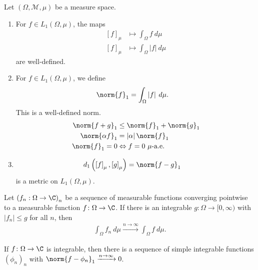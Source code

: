 \begin{fact}
  Let $\left(\Omega,\mathcal{M},\mu\right)$ be a measure space.
  \begin{enumerate}[(1)]
    \item For $f\in L_{1}\left(\Omega,\mu\right)$, the maps
      \begin{align*}
        \left[f\right]_{\mu} &\longmapsto \int_{\Omega}^{} f\:d\mu\\
        \left[f\right]_{\mu} &\longmapsto \int_{\Omega}^{} \left\vert f \right\vert\:d\mu
      \end{align*}
      are well-defined.
    \item For $f\in L_{1}\left(\Omega,\mu\right)$, we define
      \begin{align*}
        \norm{f}_{1} &= \int_{\Omega}^{} \left\vert f \right\vert\:d\mu.
      \end{align*}
      This is a well-defined norm.
      \begin{align*}
        \norm{f+g}_{1} &\leq \norm{f}_{1} + \norm{g}_{1}\\
        \norm{\alpha f}_1 &= \left\vert \alpha \right\vert\norm{f}_{1}\\
        \norm{f}_1 = 0 &\Leftrightarrow f= 0 \text{ $\mu$-a.e.}
      \end{align*}
    \item 
      \begin{align*}
        d_1\left(\left[f\right]_{\mu},\left[g\right]_{\mu}\right) &= \norm{f-g}_{1}
      \end{align*}
      is a metric on $L_{1}\left(\Omega,\mu\right)$.
  \end{enumerate}
\end{fact}
\begin{theorem}
  Let $\left(f_n:\Omega\rightarrow \C\right)_{n}$ be a sequence of measurable functions converging pointwise to a measurable function $f\colon \Omega\rightarrow \C$. If there is an integrable $g\colon \Omega \rightarrow [0,\infty)$ with $\left\vert f_n \right\vert\leq g$ for all $n$, then
  \begin{align*}
    \int_{\Omega}^{} f_n\:d\mu \xrightarrow{n\rightarrow\infty}\int_{\Omega}^{} f\:d\mu.
  \end{align*}
\end{theorem}
\begin{corollary}
  If $f\colon \Omega\rightarrow \C$ is integrable, then there is a sequence of simple integrable functions $\left(\phi_n\right)_n$ with $\norm{f - \phi_{n}}_{1}\xrightarrow{n\rightarrow\infty}0$.
\end{corollary}
